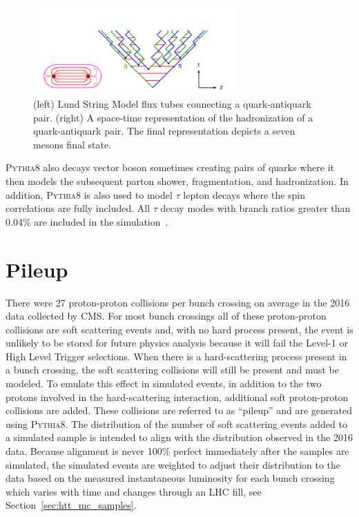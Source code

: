 \begin{figure}[htbp]
\centering
     \includegraphics[width=0.7\textwidth]{simulation/plots/lund_time-space.png}
     \caption{
(left) Lund String Model flux tubes connecting a quark-antiquark pair. (right) A
space-time representation of the hadronization of a quark-antiquark pair. 
The final representation depicts a seven mesons final state.
     }
     \label{fig:sim_lund_string}
\end{figure}

\textsc{Pythia8} also decays vector boson sometimes creating pairs of quarks where
it then models the subsequent parton shower, fragmentation, and hadronization.
In addition, \textsc{Pythia8} is also used to model $\tau$ lepton decays where the spin
correlations are fully included. All $\tau$ decay modes with branch ratios greater than 0.04\%
are included in the simulation~\cite{ILTEN201477}.



\section{Pileup}
There were 27 proton-proton collisions per bunch crossing on average
in the 2016 data collected by CMS.
For most bunch crossings all of these proton-proton collisions are soft
scattering events and, with no hard process present, the event is unlikely to be stored for
future physics analysis because it will fail the Level-1 or High Level Trigger selections. 
When there is a hard-scattering process present in a bunch crossing,
the soft scattering collisions will still be present and must be modeled. 
To emulate this effect in simulated events, in addition to the two protons involved in the 
hard-scattering interaction, additional soft proton-proton collisions are added.
These collisions are referred to as ``pileup'' and are generated using
\textsc{Pythia8}. 
The distribution of the number of soft scattering events added to a simulated 
sample is intended to align with the distribution observed in the 2016 data.
Because alignment is never 100\% perfect immediately after the samples are simulated, the simulated events
are weighted to adjust their distribution to the data based on the measured instantaneous
luminosity for each bunch crossing which 
varies with time and changes through an LHC fill, see Section~\ref{sec:htt_mc_samples}.



